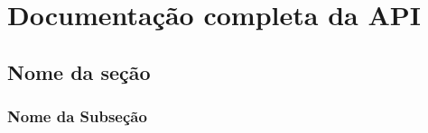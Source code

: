 
\chapter{Documentação completa da API}


\section{Nome da seção}



\subsection{Nome da Subseção}



